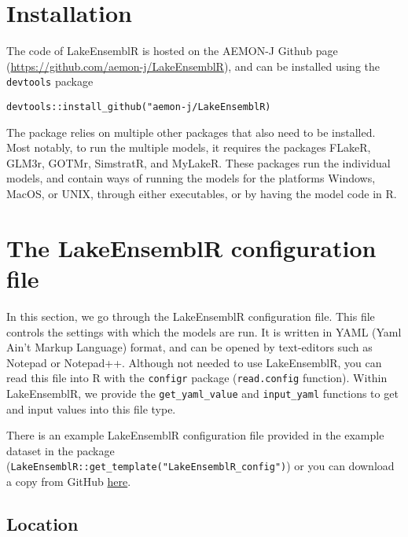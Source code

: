 \documentclass[
]{article}
\begin{document}
\hypertarget{installation}{%
\section{Installation}\label{installation}}

The code of LakeEnsemblR is hosted on the AEMON-J Github page
(\url{https://github.com/aemon-j/LakeEnsemblR}), and can be installed
using the \texttt{devtools} package

\begin{verbatim}
devtools::install_github("aemon-j/LakeEnsemblR)
\end{verbatim}

The package relies on multiple other packages that also need to be
installed. Most notably, to run the multiple models, it requires the
packages FLakeR, GLM3r, GOTMr, SimstratR, and MyLakeR. These packages
run the individual models, and contain ways of running the models for
the platforms Windows, MacOS, or UNIX, through either executables, or by
having the model code in R.

\hypertarget{the-lakeensemblr-configuration-file}{%
\section{The LakeEnsemblR configuration
file}\label{the-lakeensemblr-configuration-file}}

In this section, we go through the LakeEnsemblR configuration file. This
file controls the settings with which the models are run. It is written
in YAML (Yaml Ain't Markup Language) format, and can be opened by
text-editors such as Notepad or Notepad++. Although not needed to use
LakeEnsemblR, you can read this file into R with the \texttt{configr}
package (\texttt{read.config} function). Within LakeEnsemblR, we provide
the \texttt{get\_yaml\_value} and \texttt{input\_yaml} functions to get
and input values into this file type.

There is an example LakeEnsemblR configuration file provided in the
example dataset in the package
(\texttt{LakeEnsemblR::get\_template("LakeEnsemblR\_config")}) or you
can download a copy from GitHub
\href{https://github.com/aemon-j/LakeEnsemblR/blob/master/inst/extdata/feeagh/Feeagh_master_config.yaml}{here}.

\hypertarget{location}{%
\subsection{Location}\label{location}}
\end{document}
